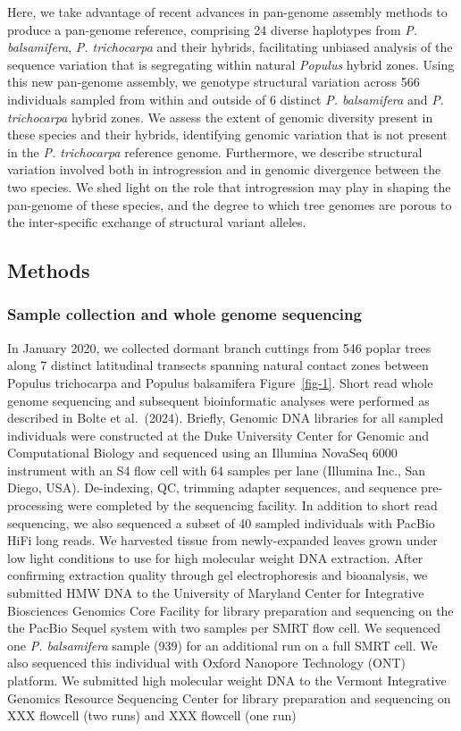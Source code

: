 \documentclass[
]{agujournal2019}
\begin{document}
Here, we take advantage of recent advances in pan-genome assembly
methods to produce a pan-genome reference, comprising 24 diverse
haplotypes from \emph{P. balsamifera}, \emph{P. trichocarpa} and their
hybrids, facilitating unbiased analysis of the sequence variation that
is segregating within natural \emph{Populus} hybrid zones. Using this
new pan-genome assembly, we genotype structural variation across 566
individuals sampled from within and outside of 6 distinct \emph{P.
balsamifera} and \emph{P. trichocarpa} hybrid zones. We assess the
extent of genomic diversity present in these species and their hybrids,
identifying genomic variation that is not present in the \emph{P.
trichocarpa} reference genome. Furthermore, we describe structural
variation involved both in introgression and in genomic divergence
between the two species. We shed light on the role that introgression
may play in shaping the pan-genome of these species, and the degree to
which tree genomes are porous to the inter-specific exchange of
structural variant alleles.

\subsection{Methods}\label{methods}

\subsubsection{Sample collection and whole genome
sequencing}\label{sample-collection-and-whole-genome-sequencing}

In January 2020, we collected dormant branch cuttings from 546 poplar
trees along 7 distinct latitudinal transects spanning natural contact
zones between Populus trichocarpa and Populus balsamifera
Figure~\ref{fig-1}. Short read whole genome sequencing and subsequent
bioinformatic analyses were performed as described in Bolte et
al.~(2024). Briefly, Genomic DNA libraries for all sampled individuals
were constructed at the Duke University Center for Genomic and
Computational Biology and sequenced using an Illumina NovaSeq 6000
instrument with an S4 flow cell with 64 samples per lane (Illumina Inc.,
San Diego, USA). De-indexing, QC, trimming adapter sequences, and
sequence pre-processing were completed by the sequencing facility. In
addition to short read sequencing, we also sequenced a subset of 40
sampled individuals with PacBio HiFi long reads. We harvested tissue
from newly-expanded leaves grown under low light conditions to use for
high molecular weight DNA extraction. After confirming extraction
quality through gel electrophoresis and bioanalysis, we submitted HMW
DNA to the University of Maryland Center for Integrative Biosciences
Genomics Core Facility for library preparation and sequencing on the the
PacBio Sequel system with two samples per SMRT flow cell. We sequenced
one \emph{P. balsamifera} sample (939) for an additional run on a full
SMRT cell. We also sequenced this individual with Oxford Nanopore
Technology (ONT) platform. We submitted high molecular weight DNA to the
Vermont Integrative Genomics Resource Sequencing Center for library
preparation and sequencing on XXX flowcell (two runs) and XXX flowcell
(one run)
\end{document}
